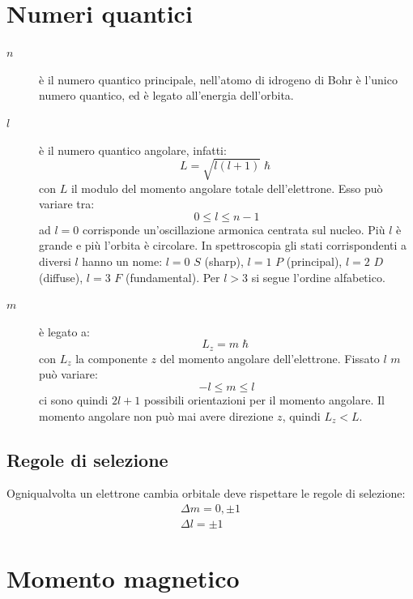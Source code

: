 \section{Numeri quantici}
\begin{description}
	\item[$n$]
		è il numero quantico principale, nell'atomo di idrogeno di Bohr è l'unico numero quantico, ed è legato all'energia dell'orbita.
	\item[$l$]
		è il numero quantico angolare, infatti:
		\begin{equation}
			L=\sqrt{l(l+1)}\hslash
		\end{equation}
		con $L$ il modulo del momento angolare totale dell'elettrone. Esso può variare tra:
		\begin{equation}
			0\leq l\leq n-1
		\end{equation}
		ad $l=0$ corrisponde un'oscillazione armonica centrata sul nucleo. Più $l$ è grande e più l'orbita è circolare. In spettroscopia gli stati corrispondenti a diversi $l$ hanno un nome: $l=0$ $S$ (sharp), $l=1$ $P$ (principal), $l=2$ $D$ (diffuse), $l=3$ $F$ (fundamental). Per $l>3$ si segue l'ordine alfabetico.
	\item[$m$]
		è legato a:
		\begin{equation}
			L_z=m\hslash
		\end{equation}
		con $L_z$ la componente $z$ del momento angolare dell'elettrone. Fissato $l$ $m$ può variare:
		\begin{equation}
			-l\leq m\leq l
		\end{equation}
		ci sono quindi $2l+1$ possibili orientazioni per il momento angolare. Il momento angolare non può mai avere direzione $z$, quindi $L_z<L$.
\end{description}
\subsection{Regole di selezione}
Ogniqualvolta un elettrone cambia orbitale deve rispettare le regole di selezione:
\begin{subequations}
	\begin{gather}
		\Delta m=0,\pm 1\\
		\Delta l=\pm 1
	\end{gather}
\end{subequations}
\section{Momento magnetico}
